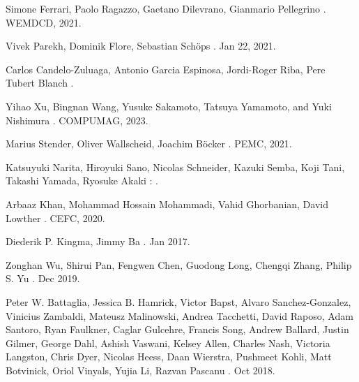 \documentclass{report} %
\begin{document}
\begin{thebibliography}{00}
    \newblock Simone Ferrari, Paolo Ragazzo, Gaetano Dilevrano, Gianmario Pellegrino
    .
    \newblock WEMDCD, 2021.

    \newblock Vivek Parekh, Dominik Flore, Sebastian Schöps
    .
    \newblock Jan 22, 2021.

    \newblock Carlos Candelo-Zuluaga, Antonio Garcia Espinosa, Jordi-Roger Riba, Pere Tubert Blanch
    .
    
    \newblock Yihao Xu, Bingnan Wang, Yusuke Sakamoto, Tatsuya Yamamoto, and Yuki Nishimura
    .
    \newblock COMPUMAG, 2023.

    \newblock Marius Stender, Oliver Wallscheid, Joachim Böcker
    .
    \newblock PEMC, 2021.

    \newblock Katsuyuki Narita, Hiroyuki Sano, Nicolas Schneider, Kazuki Semba, Koji Tani, Takashi Yamada, Ryosuke Akaki
    :
    .
    
    \newblock Arbaaz Khan, Mohammad Hossain Mohammadi, Vahid Ghorbanian, David Lowther
    .
    \newblock CEFC, 2020.

    \newblock Diederik P. Kingma, Jimmy Ba
    .
     Jan 2017.

    \newblock Zonghan Wu, Shirui Pan, Fengwen Chen, Guodong Long, Chengqi Zhang, Philip S. Yu
    .
     Dec 2019.

    \newblock Peter W. Battaglia, Jessica B. Hamrick, Victor Bapst, Alvaro Sanchez-Gonzalez, Vinicius Zambaldi, Mateusz Malinowski, Andrea Tacchetti, David Raposo, 
    Adam Santoro, Ryan Faulkner, Caglar Gulcehre, Francis Song, Andrew Ballard, Justin Gilmer, George Dahl, Ashish Vaswani, Kelsey Allen, Charles Nash,
    Victoria Langston, Chris Dyer, Nicolas Heess, Daan Wierstra, Pushmeet Kohli, Matt Botvinick, Oriol Vinyals, Yujia Li, Razvan Pascanu
    .
     Oct 2018.


\end{thebibliography}
\end{document}
